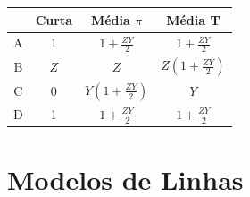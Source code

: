 \documentclass[conference]{IEEEtran}
\begin{document}
%


\renewcommand{\arraystretch}{1.5}
\begin{center}

    \begin{tabular}{|c||c||c||c|}
        \hline
        {} & Curta & Média $\pi$ & Média T \\
        \hline
        A & 1 & $1 + \frac{Z Y}{2}$  & $1 + \frac{Z Y}{2}$ \\
        B & $Z$ & $Z$  & $ Z \left( 1 + \frac{Z Y}{2}\right)$ \\
        C & 0 &  $ Y \left(1 + \frac{Z Y}{2}\right)$ &  $Y$ \\
        D & 1 & $1 + \frac{Z Y}{2}$  &  $1 + \frac{Z Y}{2}$ \\
        \hline
    \end{tabular}

\end{center}





\section{\textbf{Modelos de Linhas}}
\end{document}
